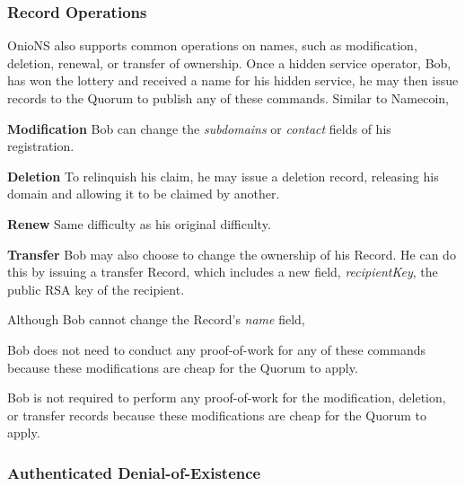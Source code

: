 \documentclass[USenglish,oneside,twocolumn]{article}
\begin{document}
\subsubsection{Record Operations} %
\label{sec:recordOps}

OnioNS also supports common operations on names, such as modification, deletion, renewal, or transfer of ownership. Once a hidden service operator, Bob, has won the lottery and received a name for his hidden service, he may then issue records to the Quorum to publish any of these commands. Similar to Namecoin, 

\textbf{Modification} Bob can change the \emph{subdomains} or \emph{contact} fields of his registration.

\textbf{Deletion} To relinquish his claim, he may issue a deletion record, releasing his domain and allowing it to be claimed by another.

\textbf{Renew}  Same difficulty as his original difficulty.

\textbf{Transfer} Bob may also choose to change the ownership of his Record. He can do this by issuing a transfer Record, which includes a new field, \emph{recipientKey}, the public RSA key of the recipient.


Although Bob cannot change the Record's \emph{name} field,

 Bob does not need to conduct any proof-of-work for any of these commands because these modifications are cheap for the Quorum to apply.
 
Bob is not required to perform any proof-of-work for the modification, deletion, or transfer records because these modifications are cheap for the Quorum to apply. 

	
\subsubsection{Authenticated Denial-of-Existence} %
\label{sec:authDenial}

\end{document}
